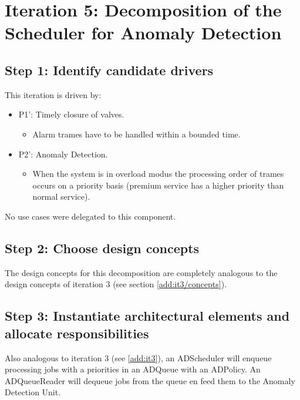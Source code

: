 \section{Iteration 5: Decomposition of the Scheduler for Anomaly Detection}
\label{add:it5}

\subsection{Step 1: Identify candidate drivers}
\label{add:it5/drivers}

\npar This iteration is driven by:

\begin{itemize}
	\item P1': Timely closure of valves.
	\begin{itemize}
  		\item Alarm trames have to be handled within a bounded time. 
    \end{itemize}
	\item P2': Anomaly Detection.
	\begin{itemize}
	  \item When the system is in overload modus the processing order of trames
	  occurs on a priority basis (premium service has a higher priority than
	  normal service).
	\end{itemize}
\end{itemize}

\npar No use cases were delegated to this component.

\subsection{Step 2: Choose design concepts}
\label{add:it5/concepts}

\npar The design concepts for this decomposition are completely analogous to the
design concepts of iteration 3 (see section \ref{add:it3/concepts}). 

\subsection{Step 3: Instantiate architectural elements and allocate responsibilities}
\label{add:it5/elements}

\npar Also analogous to iteration 3 (see \ref{add:it3}), an ADScheduler will
enqueue processing jobs with a priorities in an ADQueue with an ADPolicy. An
ADQueueReader will dequeue jobs from the queue en feed them
to the Anomaly Detection Unit. 

